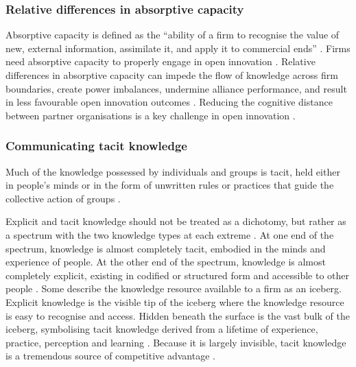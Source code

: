 \subsubsection{Relative differences in absorptive capacity}

Absorptive capacity is defined as the \enquote{ability of a firm to recognise the value of new, external information, assimilate it, and apply it to commercial ends} \citep{cohen1990absorptive}. Firms need absorptive capacity to properly engage in open innovation \citep{vanhaverbeke2007connecting}. Relative differences in absorptive capacity can impede the flow of knowledge across firm boundaries, create power imbalances, undermine alliance performance, and result in less favourable open innovation outcomes \citep{szulanski1996exploring,lane1998relative,nooteboom2000learning,vanhaverbeke2007connecting,easterby2008absorptive,phelps2012knowledge}. Reducing the cognitive distance between partner organisations is a key challenge in open innovation \citep{nooteboom2000learning,vanhaverbeke2007connecting}. \medskip

\subsubsection{Communicating tacit knowledge}

Much of the knowledge possessed by individuals and groups is tacit, held either in people's minds or in the form of unwritten rules or practices that guide the collective action of groups \citep{mowery1996strategic,leonard1998role,burt2007secondhand,goksel2016can,lichtenthaler2016absorptive}. \medskip

Explicit and tacit knowledge should not be treated as a dichotomy, but rather as a spectrum with the two knowledge types at each extreme \citep{polanyi1966tacit,inkpen1998knowledge,cavusgil2003tacit}. At one end of the spectrum, knowledge is almost completely tacit, embodied in the minds and experience of people. At the other end of the spectrum, knowledge is almost completely explicit, existing in codified or structured form and accessible to other people \citep{leonard1998role}. Some describe the knowledge resource available to a firm as an iceberg. Explicit knowledge is the visible tip of the iceberg where the knowledge resource is easy to recognise and access. Hidden beneath the surface is the vast bulk of the iceberg, symbolising tacit knowledge derived from a lifetime of experience, practice, perception and learning \citep{haldin2000difficulties,mcadam2007exploring,rebernik2007fostering}. Because it is largely invisible, tacit knowledge is a tremendous source of competitive advantage \citep{nelson1982evolutionary,barney1991firm,grant1996toward,smith2001role,chilton2007dimensions,lu2015job}.\medskip

